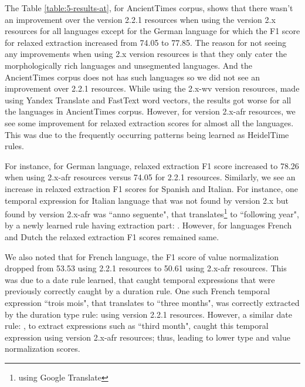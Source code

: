\clearpage 

The Table \ref{table:5-results-at}, for AncientTimes corpus, shows that there wasn't an improvement over the version 2.2.1 resources when using the version 2.x resources for all languages except for the German language for which the F1 score for relaxed extraction increased from 74.05 to 77.85. The reason for not seeing any improvements when using 2.x version resources is that they only cater the morphologically rich languages and unsegmented languages. And the AncientTimes corpus does not has such languages so we did not see an improvement over 2.2.1 resources. While using the 2.x-wv version resources, made using Yandex Translate and FastText word vectors, the results got worse for all the languages in AncientTimes corpus. However, for version 2.x-afr resources, we see some improvement for relaxed extraction scores for almost all the languages. This was due to the frequently occurring patterns being learned as HeidelTime rules. 

For instance, for German language, relaxed extraction F1 score increased to 78.26 when using 2.x-afr resources versus 74.05 for 2.2.1 resources.  Similarly, we see an increase in relaxed extraction F1 scores for Spanish and Italian. For instance, one temporal expression for Italian language that was not found by version 2.x but found by version 2.x-afr was ``anno seguente", that translates\footnote{using Google Translate} to ``following year", by a newly learned rule having extraction part: . However, for languages French and Dutch the relaxed extraction F1 scores remained same. 

We also noted that for French language, the F1 score of value normalization dropped from 53.53 using 2.2.1 resources to 50.61 using 2.x-afr resources. This was due to a date rule learned, that caught temporal expressions that were previously correctly caught by a duration rule. One such French temporal expression ``trois mois", that translates to ``three months", was correctly extracted by the duration type rule:  using version 2.2.1 resources. However, a similar date rule: , to extract expressions such as ``third month", caught this temporal expression using version 2.x-afr resources; thus, leading to lower type and value normalization scores. 


